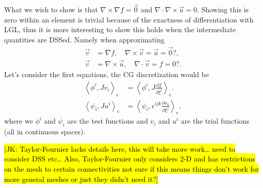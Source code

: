 \documentclass{report}
\newcommand{\inner}[2]{ \left\langle #1, #2 \right\rangle }
\begin{document}
What we wish to show is that $\nabla \times \nabla f = \vec{0}$ and $\nabla \cdot \nabla \times \vec{u} = 0$.
Showing this is zero within an element is trivial because of the exactness of differentiation with LGL,
thus it is more interesting to show this holds when the intermediate quantities are DSSed.
Namely when approximating
\begin{align}
    \vec{v} &= \nabla f, \quad \nabla \times \vec{v} = \vec{u} = \vec{0}?,\\
    \vec{v} &= \nabla \times \vec{u}, \quad \nabla \cdot \vec{v} = f = 0?.
\end{align}
Let's consider the first equations, the CG discretization would be
\begin{align}
   \inner{\phi^{i}}{Jv_{i}}_{e} &= \inner{\phi^{i}}{J \frac{\partial f}{\partial \xi^{i}}}_{e}.\\
   \inner{\psi_{i}}{Ju^{i}}_{e} &= \inner{\psi_{i}}{\epsilon^{ijk} \frac{\partial v_{k}}{\partial \xi^{j}}}_{e},
\end{align}
where we $\phi^{i}$ and $\psi_{i}$ are the test functions and
$v_{i}$ and $u^{i}$ are the trial functions (all in continuous spaces).

\hl{[JK: Taylor-Fournier lacks details here, this will take more work\dots
need to consider DSS etc\dots
Also, Taylor-Fournier only considers 2-D and has restrictions on the mesh to certain connectivities
not sure if this means things don't work for more general meshes or just they didn't need it?]}

\end{document}
